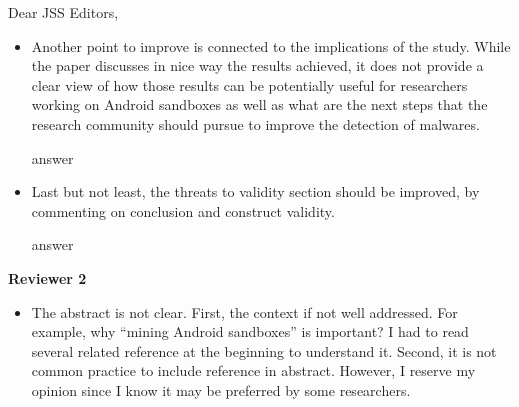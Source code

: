 \documentclass[12pt,english]{scrlttr2}
\begin{document}
\begin{letter}{Dear JSS Editors,}
\begin{itemize}
\vspace{0.2cm}

{\color{blue}{\bf Answer.} Thanks for this comment. We make avaiable our tool, datasets and
  scripts in the following links:

  \begin{itemize}
    \item \href{https://github.com/droidxp/benchmark}{GitHub repository}.
    \item \href{https://htmlpreview.github.io/?https://github.com/droidxp/paper-replication-package/blob/master/replication.html}{datasets and scripts}
  \end{itemize}
  
\vspace{0.2cm}\newline
At Section 1 (Introduction) we highlight the existence of these 2 repositories that can be useful for other researchers interested in our study.}

\vspace{0.2cm}

\item Another point to improve is connected to the implications of the study. While the paper discusses in nice way the 
results achieved, it does not provide a clear view of how those results can be potentially useful for researchers 
working on Android sandboxes as well as what are the next steps that the research community should pursue to 
improve the detection of malwares.


\vspace{0.2cm}

{\color{blue}{\bf Answer.} answer}

\vspace{0.2cm}

\item Last but not least, the threats to validity section should be improved, by commenting on conclusion and construct validity.


\vspace{0.2cm}

{\color{blue}{\bf Answer:} answer}


\end{itemize}

{\bf Reviewer 2}

\begin{itemize}

\item The abstract is not clear. First, the context if not well addressed. For example, why ``mining Android sandboxes'' is 
important? I had to read several related reference at the beginning to understand it. Second, it is not common practice to 
include reference in abstract. However, I reserve my opinion since I know it may be preferred by some researchers.



\end{itemize}
\end{letter}
\end{document}
